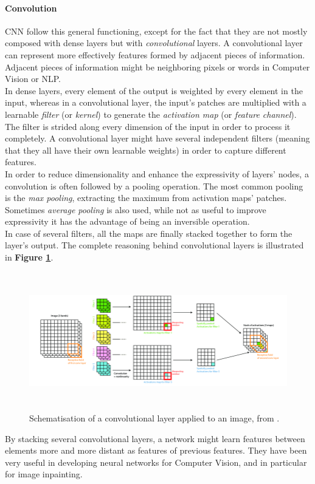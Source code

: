 \documentclass{article}
\begin{document}
\paragraph{Convolution} CNN follow this general functioning, except for the fact that they are not mostly composed with dense layers but with \textit{convolutional} layers. A convolutional layer can represent more effectively features formed by adjacent pieces of information. Adjacent pieces of information might be neighboring pixels or words in Computer Vision or NLP. \\
In dense layers, every element of the output is weighted by every element in the input, whereas in a convolutional layer, the input's patches are multiplied with a learnable \textit{filter} (or \textit{kernel}) to generate the \textit{activation map} (or \textit{feature channel}). The filter is strided along every dimension of the input in order to process it completely. A convolutional layer might have several independent filters (meaning that they all have their own learnable weights) in order to capture different features. \\
In order to reduce dimensionality and enhance the expressivity of layers' nodes, a convolution is often followed by a pooling operation. The most common pooling is the \textit{max pooling}, extracting the maximum from activation maps' patches. Sometimes \textit{average pooling} is also used, while not as useful to improve expressivity it has the advantage of being an inversible operation. \\
In case of several filters, all the maps are finally stacked together to form the layer's output. The complete reasoning behind convolutional layers is illustrated in \textbf{Figure \ref{fig:conv_layer}}.
\begin{figure}[H]
    \centering
    \includegraphics[height=6cm,width=\textwidth,keepaspectratio]{conv_layer.png}
    \caption{Schematisation of a convolutional layer applied to an image, from \cite{conv_layer_img}.}
    \label{fig:conv_layer}
\end{figure}
By stacking several convolutional layers, a network might learn features between elements more and more distant as features of previous features. They have been very useful in developing neural networks for Computer Vision, and in particular for image inpainting.
\end{document}
